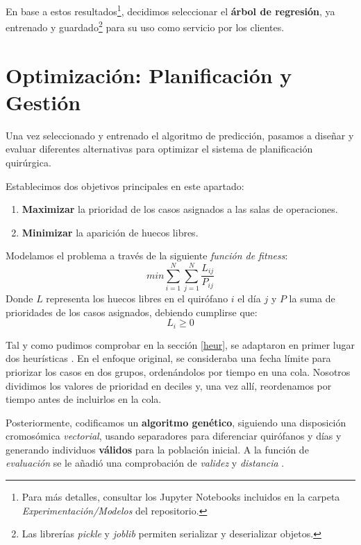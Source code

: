 En base a estos resultados\footnote{Para más detalles, consultar los Jupyter Notebooks incluidos en la carpeta \textit{Experimentación/Modelos} del repositorio.}, decidimos seleccionar el \textbf{árbol de regresión}, ya entrenado y guardado\footnote{Las librerías \textit{pickle} y \textit{joblib} permiten serializar y deserializar objetos.} para su uso como servicio por los clientes.



\newpage

\section{Optimización: Planificación y Gestión}


Una vez seleccionado y entrenado el algoritmo de predicción, pasamos a diseñar y evaluar diferentes alternativas para optimizar el sistema de planificación quirúrgica.

Establecimos dos objetivos principales en este apartado:
\begin{enumerate}
    \item \textbf{Maximizar} la prioridad de los casos asignados a las salas de operaciones.
    \item \textbf{Minimizar} la aparición de huecos libres.
\end{enumerate}

Modelamos el problema a través de la siguiente \textit{función de fitness}:
\begin{equation}
    min \sum_{i=1}^{N} \sum_{j=1}^{N}\frac{L_{ij}}{P_{ij}}
\end{equation}
Donde $L$ representa los huecos libres en el quirófano $i$ el día $j$ y $P$ la suma de prioridades de los casos asignados, debiendo cumplirse que:
\begin{equation}
    L_{i}\geq 0
\end{equation}

Tal y como pudimos comprobar en la sección \ref{heur}, se adaptaron en primer lugar dos heurísticas \cite{Lin2020AScheduling}. 
En el enfoque original, se consideraba una fecha límite para priorizar los casos en dos grupos, ordenándolos por tiempo en una cola. Nosotros dividimos los valores de prioridad en deciles y, una vez allí, reordenamos por tiempo antes de incluirlos en la cola.

Posteriormente, codificamos un \textbf{algoritmo genético}, siguiendo una disposición cromosómica \textit{vectorial}, usando separadores para diferenciar quirófanos y días y generando individuos \textbf{válidos} para la población inicial.
A la función de \textit{evaluación} se le añadió una comprobación de \textit{validez} y \textit{distancia} \cite{CoelloCoello2002TheoreticalArt}.


